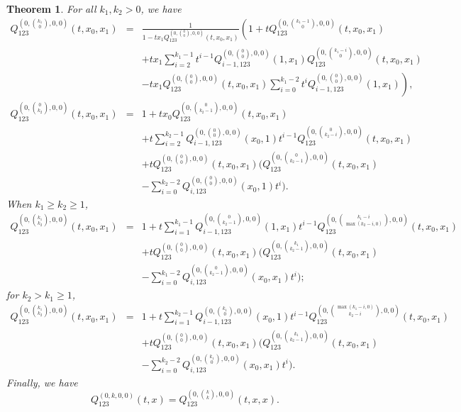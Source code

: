 \documentclass[
final,nomarks
]{dmtcs-episciences}
\newtheorem{theorem}{Theorem}
\newcommand{\Qm}[1]{Q_{123}^{(#1)}(t,x)}
\newcommand{\Qmz}[2]{Q_{123}^{(0,\binom{#1}{#2},0,0)}(t,x_0,x_1)}
\newcommand{\Qmzn}[3]{Q_{#3,123}^{(0,\binom{#1}{#2},0,0)}(x_0,x_1)}
\newcommand{\Qmznx}[4]{Q_{#3,123}^{(0,\binom{#1}{#2},0,0)}(#4)}
\newcommand{\Qmzx}[3]{Q_{123}^{(0,\binom{#1}{#2},0,0)}(t,#3)}
\begin{document}
\begin{theorem}\label{theorem:11}
	For all \begin{math}k_1,k_2>0\end{math}, we have
	\begin{eqnarray}
		\Qmz{k_1}{0}&=&\frac{1}{1-t x_1\Qmz{0}{0}}\left(1+t\Qmz{k_1-1}{0}\right.\nonumber\\\nonumber
		&&+t x_1\sum_{i=2}^{k_1-1}t^{i-1}\Qmznx{0}{0}{i-1}{1,x_1}\Qmz{k_1-i}{0}\\
		&&\left.-t x_1\Qmz{0}{0}\sum_{i=0}^{k_1-2}t^i\Qmznx{0}{0}{i-1}{1,x_1}\right),
	\end{eqnarray}
	\begin{eqnarray}
		\Qmz{0}{k_2}&=&1+t x_0 \Qmz{0}{k_2-1}\nonumber\\\nonumber
		&&+t \sum_{i=2}^{k_2-1}\Qmznx{0}{0}{i-1}{x_0,1}t^{i-1}\Qmz{0}{k_2-i}\\\nonumber
		&&+t \Qmz{0}{0} (\Qmz{0}{k_2-1}\\
		&&-\sum_{i=0}^{k_2-2}\Qmznx{0}{0}{i}{x_0,1}t^i). 
	\end{eqnarray}
	When \begin{math}k_1\geq k_2 \geq 1\end{math},
	\begin{eqnarray}
		\Qmz{k_1}{k_2}&=&1+t\sum_{i=1}^{k_1-1}\Qmznx{0}{k_2-1}{i-1}{1,x_1}t^{i-1}\Qmz{k_1-i}{\max(k_2-i,0)}\nonumber\\\nonumber
		&&+t \Qmz{0}{0}(\Qmz{k_1}{k_2-1}\\
		&&-\sum_{i=0}^{k_1-2}\Qmzn{0}{k_2-1}{i}t^i);
	\end{eqnarray}
	for \begin{math}k_2>k_1\geq 1\end{math},
	\begin{eqnarray}
		\Qmz{k_1}{k_2}&=&1+t\sum_{i=1}^{k_2-1}\Qmznx{k_1}{0}{i-1}{x_0,1}t^{i-1}\Qmz{\max(k_1-i,0)}{k_2-i}\nonumber\\\nonumber
		&&+t \Qmz{0}{0}(\Qmz{k_1}{k_2-1}\\
		&&-\sum_{i=0}^{k_2-2}\Qmzn{k_1}{0}{i}t^i). 
	\end{eqnarray}
	Finally, we have
	\begin{equation}
	\Qm{0,k,0,0}=\Qmzx{k}{k}{x,x}.
	\end{equation}
\end{theorem}
\end{document}
